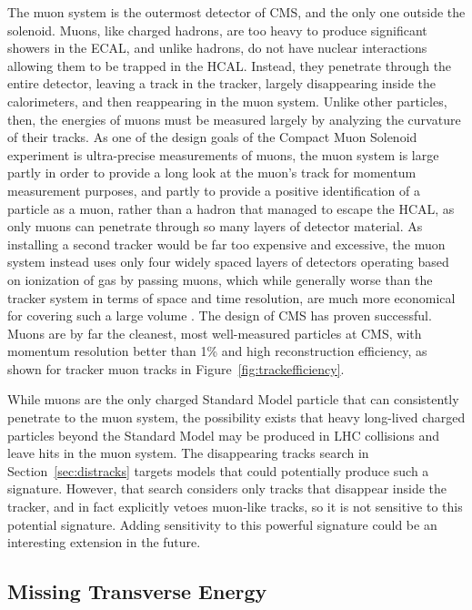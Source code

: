   The muon system is the outermost detector of CMS, and the only one outside the solenoid.
  Muons, like charged hadrons, are too heavy to produce significant showers in the ECAL, and unlike hadrons, do not have nuclear interactions allowing them to be trapped in the HCAL.
  Instead, they penetrate through the entire detector, leaving a track in the tracker, largely disappearing inside the calorimeters, and then reappearing in the muon system.
  Unlike other particles, then, the energies of muons must be measured largely by analyzing the curvature of their tracks.
  As one of the design goals of the Compact Muon Solenoid experiment is ultra-precise measurements of muons, the muon system is large partly in order to provide a long look at the muon's track for momentum measurement purposes, and partly to provide a positive identification of a particle as a muon, rather than a hadron that managed to escape the HCAL, as only muons can penetrate through so many layers of detector material.
  As installing a second tracker would be far too expensive and excessive, the muon system instead uses only four widely spaced layers of detectors operating based on ionization of gas by passing muons, which while generally worse than the tracker system in terms of space and time resolution, are much more economical for covering such a large volume \cite{cms_tdr}.
  The design of CMS has proven successful. 
  Muons are by far the cleanest, most well-measured particles at CMS, with momentum resolution better than 1\% and high reconstruction efficiency, as shown for tracker muon tracks in Figure~\ref{fig:trackefficiency}.

  While muons are the only charged Standard Model particle that can consistently penetrate to the muon system, the possibility exists that heavy long-lived charged particles beyond the Standard Model may be produced in LHC collisions and leave hits in the muon system.
  The disappearing tracks search in Section~\ref{sec:distracks} targets models that could potentially produce such a signature.
  However, that search considers only tracks that disappear inside the tracker, and in fact explicitly vetoes muon-like tracks, so it is not sensitive to this potential signature.
  Adding sensitivity to this powerful signature could be an interesting extension in the future.

  \subsection{Missing Transverse Energy} \label{sec:MET}

